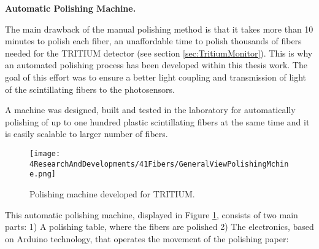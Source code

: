 \textbf{Automatic Polishing Machine.}

The main drawback of the manual polishing method is that it takes more than 10 minutes to polish each fiber, an unaffordable time to polish thousands of fibers needed for the TRITIUM detector (see section \ref{sec:TritiumMonitor}). This is why an automated polishing process has been developed within this thesis work. The goal of this effort was to ensure a better light coupling and transmission of light of the scintillating fibers to the photosensors. 



A machine was designed, built and tested in the laboratory for automatically polishing of up to one hundred plastic scintillating fibers at the same time and it is easily scalable to larger number of fibers.

\begin{figure}[h]
\centering
\texttt{[image: 4ResearchAndDevelopments/41Fibers/GeneralViewPolishingMchine.png]}
\caption{Polishing machine developed for TRITIUM.\label{fig:GeneralViewPolishingMachine}}
\end{figure}
This automatic polishing machine, displayed in Figure \ref{fig:GeneralViewPolishingMachine}, consists of two main parts: 1) A polishing table, where the fibers are polished 2) The electronics, based on Arduino technology, that operates the movement of the polishing paper:


